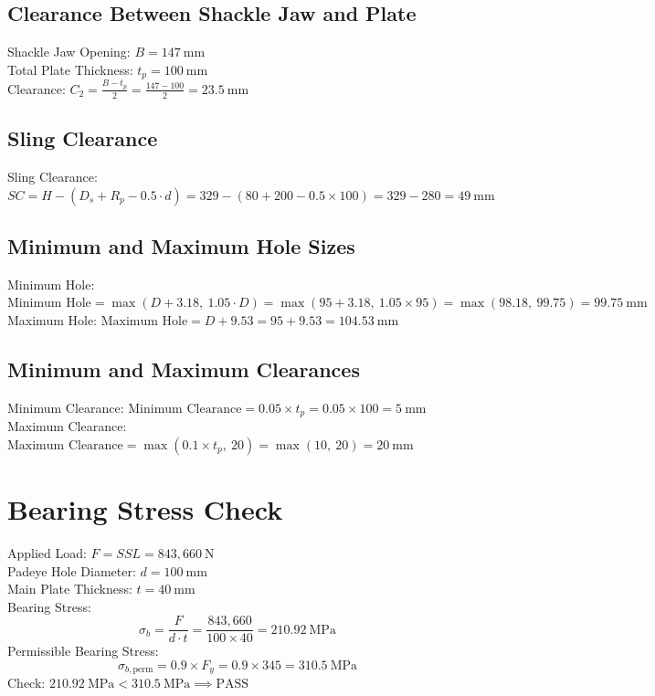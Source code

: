 \documentclass[12pt]{article}
\begin{document}
\subsection{Clearance Between Shackle Jaw and Plate}
Shackle Jaw Opening: $B = 147\ \mathrm{mm}$\\
Total Plate Thickness: $t_p = 100\ \mathrm{mm}$\\
Clearance: $C_2 = \frac{B - t_p}{2} = \frac{147 - 100}{2} = 23.5\ \mathrm{mm}$

\subsection{Sling Clearance}
Sling Clearance: $SC = H - (D_s + R_p - 0.5 \cdot d) = 329 - (80 + 200 - 0.5 \times 100) = 329 - 280 = 49\ \mathrm{mm}$

\subsection{Minimum and Maximum Hole Sizes}
Minimum Hole: $\text{Minimum Hole} = \max(D + 3.18,\ 1.05 \cdot D) = \max(95 + 3.18,\ 1.05 \times 95) = \max(98.18,\ 99.75) = 99.75\ \mathrm{mm}$\\
Maximum Hole: $\text{Maximum Hole} = D + 9.53 = 95 + 9.53 = 104.53\ \mathrm{mm}$

\subsection{Minimum and Maximum Clearances}
Minimum Clearance: $\text{Minimum Clearance} = 0.05 \times t_p = 0.05 \times 100 = 5\ \mathrm{mm}$\\
Maximum Clearance: $\text{Maximum Clearance} = \max(0.1 \times t_p,\ 20) = \max(10,\ 20) = 20\ \mathrm{mm}$

\section{Bearing Stress Check}
Applied Load: $F = SSL = 843,660\ \mathrm{N}$\\
Padeye Hole Diameter: $d = 100\ \mathrm{mm}$\\
Main Plate Thickness: $t = 40\ \mathrm{mm}$\\
Bearing Stress:
\[
\sigma_b = \frac{F}{d \cdot t} = \frac{843,660}{100 \times 40} = 210.92\ \mathrm{MPa}
\]
Permissible Bearing Stress:
\[
\sigma_{b,\text{perm}} = 0.9 \times F_y = 0.9 \times 345 = 310.5\ \mathrm{MPa}
\]
Check: $210.92\ \mathrm{MPa} < 310.5\ \mathrm{MPa} \implies \text{PASS}$
\end{document}
